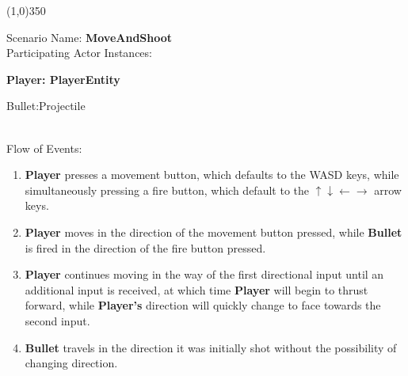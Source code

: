 \documentclass[12pt]{article}       %
\begin{document}
\begin{center} \line(1,0){350} \end{center}
Scenario Name: {\bf MoveAndShoot} \\
Participating Actor Instances:        \hspace{46pt} {\bf Player: PlayerEntity

					          \hspace{2.6 in}   Bullet:Projectile}  \vspace{10pt}  \\ 
Flow of Events: 
\begin{enumerate} 
\item {\bf Player} presses a movement button, which defaults to the WASD keys, while simultaneously pressing a fire button, which default to the $ \uparrow \downarrow \leftarrow \to $ arrow keys.
\item {\bf Player} moves in the direction of the movement button pressed, while {\bf Bullet} is fired in the direction of the fire button pressed.
\item {\bf Player} continues moving in the way of the first directional input until an additional input is received, at which time {\bf Player} will begin to thrust forward, while {\bf Player's} direction will quickly change to face towards the second input.
\item {\bf Bullet} travels in the direction it was initially shot without the possibility of changing direction.
\end{enumerate}
\end{document}
